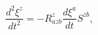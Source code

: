 \begin{equation}
\frac{d^{2}\xi ^{z}}{dt^{2}}=-R_{azb}^{z}\frac{d\xi ^{a}}{dt}S^{zb},
\label{45}
\end{equation}

